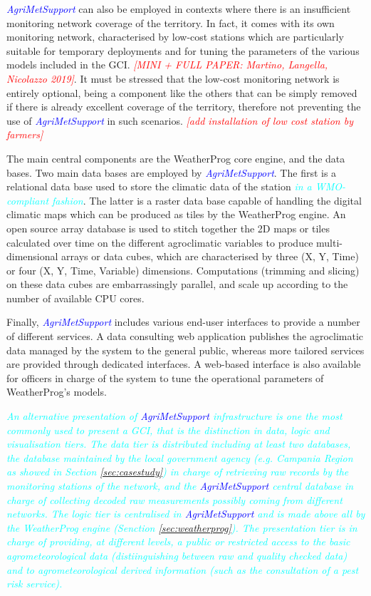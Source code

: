 \documentclass[authoryear,preprint,review,12pt]{elsarticle}
\newcommand{\note}[1]{\emph{\textcolor{red}{#1}}}
\newcommand{\update}[1]{\emph{\textcolor{blue}{#1}}}
\newcommand{\review}[1]{\emph{\textcolor{cyan}{#1}}}
\newcommand{\gci}{\update{AgriMetSupport}\xspace}
\begin{document}
\gci can also be employed in contexts where there is an insufficient monitoring network coverage of the territory.
In fact, it comes with its own monitoring network, characterised by low-cost stations which are particularly suitable for temporary deployments and for tuning the parameters of the various models included in the GCI.  \note{[MINI + FULL PAPER: Martino, Langella, Nicolazzo 2019]}.
It must be stressed that the low-cost monitoring network is entirely optional, being a component like the others that can be simply removed if there is already excellent coverage of the territory, therefore not preventing the use of \gci in such scenarios. \note{[add installation of low cost station by farmers]}

The main central components are the WeatherProg core engine, and the data bases. Two main data bases are employed by \gci.
The first is a relational data base used to store the climatic data of the station  \review{in a WMO-compliant fashion}.
The latter  is a raster data base capable of handling the digital climatic maps which can be produced as tiles by the WeatherProg engine.
An open source array database is used to stitch together the 2D maps or tiles calculated over time on the different agroclimatic variables to produce multi-dimensional arrays or data cubes, which are  characterised by three (X, Y, Time) or four (X, Y, Time, Variable) dimensions.
Computations (trimming and slicing) on these data cubes are embarrassingly parallel, and scale up according to the number of available CPU cores.

Finally, \gci includes various end-user interfaces to provide a number of different services. A data consulting web application publishes the agroclimatic data managed by the system to the general public, whereas more tailored services are provided through dedicated interfaces. A web-based interface is also available for officers in charge of the system to tune the operational parameters of WeatherProg's models.

\review{ An alternative presentation of \gci infrastructure is one the most commonly used to present a GCI, that is the distinction in data, logic and visualisation tiers.
The data tier is distributed including at least two databases, the database maintained by the local government agency (e.g. Campania Region as showed in Section \ref{sec:casestudy}) in charge of retrieving raw records by the monitoring stations of the network, and the \gci central database in charge of collecting decoded raw measurements possibly coming from different networks.
The logic tier is centralised in \gci and is made above all by the WeatherProg engine (Senction \ref{sec:weatherprog}).
The presentation tier is in charge of providing, at different levels, a public or restricted access to the basic agrometeorological data (distiinguishing between raw and quality checked data) and to agrometeorological derived information (such as the consultation of a pest risk service). }
\end{document}
